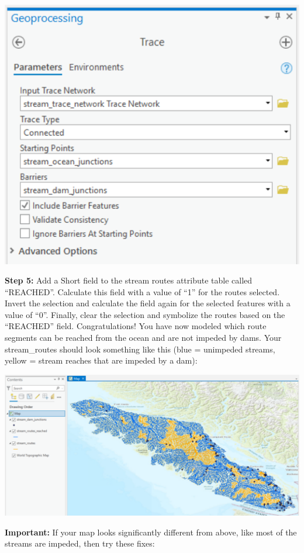 \documentclass[
]{book}
\begin{document}
\includegraphics[width=0.5\linewidth]{images/02-trace}

\textbf{Step 5:} Add a Short field to the stream routes attribute table called ``REACHED''. Calculate this field with a value of ``1'' for the routes selected. Invert the selection and calculate the field again for the selected features with a value of ``0''. Finally, clear the selection and symbolize the routes based on the ``REACHED'' field. Congratulations! You have now modeled which route segments can be reached from the ocean and are not impeded by dams. Your stream\_routes should look something like this (blue = unimpeded streams, yellow = stream reaches that are impeded by a dam):

\includegraphics[width=1\linewidth]{images/02-traced-network}

\textbf{Important:} If your map looks significantly different from above, like most of the streams are impeded, then try these fixes:
\end{document}
